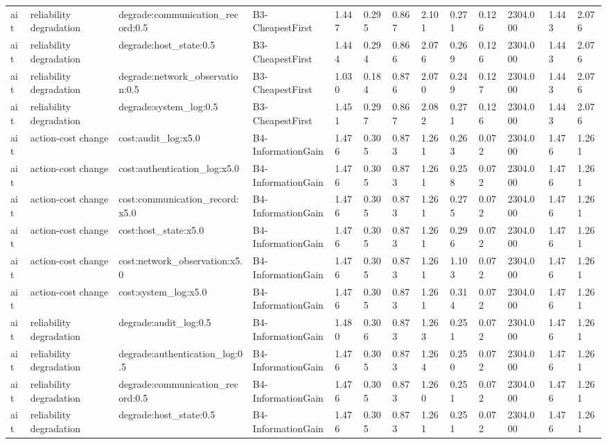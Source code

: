 \begin{table}[!ht]
{\begin{tabular}{lllllllllllll}
ait & reliability degradation & degrade:communication\_record:0.5 & B3-CheapestFirst & 1.447 & 0.295 & 0.867 & 2.101 & 0.271 & 0.126 & 2304.000 & 1.443 & 2.076 \\
ait & reliability degradation & degrade:host\_state:0.5 & B3-CheapestFirst & 1.444 & 0.294 & 0.866 & 2.076 & 0.269 & 0.126 & 2304.000 & 1.443 & 2.076 \\
ait & reliability degradation & degrade:network\_observation:0.5 & B3-CheapestFirst & 1.030 & 0.184 & 0.876 & 2.070 & 0.249 & 0.127 & 2304.000 & 1.443 & 2.076 \\
ait & reliability degradation & degrade:system\_log:0.5 & B3-CheapestFirst & 1.451 & 0.297 & 0.867 & 2.082 & 0.271 & 0.126 & 2304.000 & 1.443 & 2.076 \\
ait & action-cost change & cost:audit\_log:x5.0 & B4-InformationGain & 1.476 & 0.305 & 0.873 & 1.261 & 0.263 & 0.072 & 2304.000 & 1.476 & 1.261 \\
ait & action-cost change & cost:authentication\_log:x5.0 & B4-InformationGain & 1.476 & 0.305 & 0.873 & 1.261 & 0.258 & 0.072 & 2304.000 & 1.476 & 1.261 \\
ait & action-cost change & cost:communication\_record:x5.0 & B4-InformationGain & 1.476 & 0.305 & 0.873 & 1.261 & 0.275 & 0.072 & 2304.000 & 1.476 & 1.261 \\
ait & action-cost change & cost:host\_state:x5.0 & B4-InformationGain & 1.476 & 0.305 & 0.873 & 1.261 & 0.296 & 0.072 & 2304.000 & 1.476 & 1.261 \\
ait & action-cost change & cost:network\_observation:x5.0 & B4-InformationGain & 1.476 & 0.305 & 0.873 & 1.261 & 1.103 & 0.072 & 2304.000 & 1.476 & 1.261 \\
ait & action-cost change & cost:system\_log:x5.0 & B4-InformationGain & 1.476 & 0.305 & 0.873 & 1.261 & 0.314 & 0.072 & 2304.000 & 1.476 & 1.261 \\
ait & reliability degradation & degrade:audit\_log:0.5 & B4-InformationGain & 1.480 & 0.306 & 0.873 & 1.263 & 0.251 & 0.072 & 2304.000 & 1.476 & 1.261 \\
ait & reliability degradation & degrade:authentication\_log:0.5 & B4-InformationGain & 1.476 & 0.305 & 0.873 & 1.264 & 0.250 & 0.072 & 2304.000 & 1.476 & 1.261 \\
ait & reliability degradation & degrade:communication\_record:0.5 & B4-InformationGain & 1.476 & 0.305 & 0.873 & 1.260 & 0.251 & 0.072 & 2304.000 & 1.476 & 1.261 \\
ait & reliability degradation & degrade:host\_state:0.5 & B4-InformationGain & 1.476 & 0.305 & 0.873 & 1.261 & 0.251 & 0.072 & 2304.000 & 1.476 & 1.261 \\

\end{tabular}}
\end{table}
